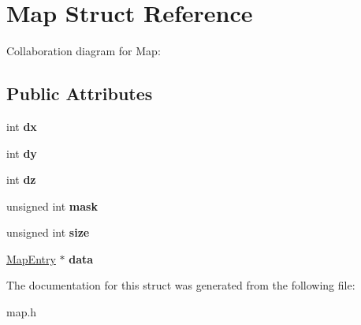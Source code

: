 \hypertarget{structMap}{}\section{Map Struct Reference}
\label{structMap}


Collaboration diagram for Map\+:
\subsection*{Public Attributes}
\begin{DoxyCompactItemize}
\item 
\mbox{\label{structMap_a991fca09761e4ded5b69269776be11ee}} 
int {\bfseries dx}
\item 
\mbox{\label{structMap_a64d19e88d54fa48e437044c88f674308}} 
int {\bfseries dy}
\item 
\mbox{\label{structMap_a1f17ec06f672496c2582b60dce199f68}} 
int {\bfseries dz}
\item 
\mbox{\label{structMap_a2211aadc9745a27b0e07a3af85989bd5}} 
unsigned int {\bfseries mask}
\item 
\mbox{\label{structMap_a73754296f937e5d5fbf40b4be90c8e8c}} 
unsigned int {\bfseries size}
\item 
\mbox{\label{structMap_a8ef299519738b44dc1ae95c6410f0b56}} 
\hyperlink{unionMapEntry}{Map\+Entry} $\ast$ {\bfseries data}
\end{DoxyCompactItemize}


The documentation for this struct was generated from the following file\+:\begin{DoxyCompactItemize}
\item 
map.\+h\end{DoxyCompactItemize}
